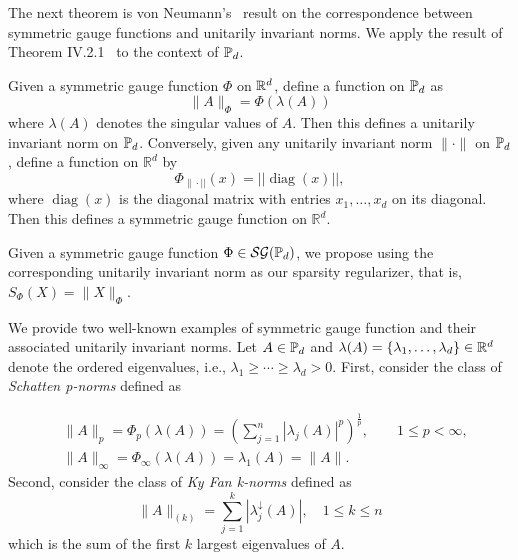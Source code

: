 \documentclass[sn-nature]{sn-jnl}%
\theoremstyle{thmstyleone}%
\theoremstyle{thmstyletwo}%
\theoremstyle{thmstylethree}%
\begin{document}
The next theorem is von Neumann's~\cite{von1937some} result on the correspondence between symmetric gauge functions and unitarily invariant norms. We apply the result of Theorem IV.2.1~\cite{bhatia97} to the context of $\mathbb{P}_d$.

    \begin{theorem}
        Given a symmetric gauge function $\Phi$ on $\mathbb{R}^d$, define a function on $\mathbb{P}_d$ as 
        \[
        \|A\|_\Phi = \Phi(\lambda(A))
        \]
        where $\lambda(A)$ denotes the singular values of $A$. Then this defines a unitarily invariant norm on $\mathbb{P}_d$. Conversely, given any unitarily invariant norm $\| \cdot \|$ on $\mathbb{P}_d$, define a function on $\mathbb{R}^d$ by
$$
\Phi_{\| \cdot||}(x)=|| \operatorname{diag}(x)||,
$$
where $\operatorname{diag}(x)$ is the diagonal matrix with entries $x_1, \ldots, x_d$ on its diagonal. Then this defines a symmetric gauge function on $\mathbb{R}^d$.
    \end{theorem}


\begin{remark}\normalfont
    Given a symmetric gauge function $\Phi \in \mathcal{SG}(\mathbb{P}_d)$, we propose using the corresponding unitarily invariant norm as our sparsity regularizer, that is, $S_\Phi(X) = \|X\|_\Phi$.
\end{remark} 


\begin{example}
    We provide two well-known examples of symmetric gauge function and their associated unitarily invariant norms. Let $A \in \mathbb{P}_d$ and $\lambda(A) = \{\lambda_1, \ldots, \lambda_d\} \in \mathbb{R}^d$ denote the ordered eigenvalues, i.e., $\lambda_1 \geq \cdots \geq \lambda_d > 0$. First, consider the class of \textit{Schatten p-norms} defined as 

\[
\begin{aligned}
    &\|A\|_p = \Phi_p(\lambda(A)) = \left( \sum_{j=1}^n |\lambda_j(A)|^p \right)^{\frac{1}{p}}, \qquad 1 \leq p < \infty,
    \\ &\|A\|_{\infty}=\Phi_{\infty}(\lambda(A))=\lambda_1(A)=\|A\| .
\end{aligned}
\]
Second, consider the class of \textit{Ky Fan k-norms} defined as 
\[
\|A\|_{(k)}=\sum_{j=1}^k |\lambda_j^{\downarrow}(A)|, \quad 1 \leq k \leq n
\]
which is the sum of the first $k$ largest eigenvalues of $A$.
\end{example}
\end{document}
